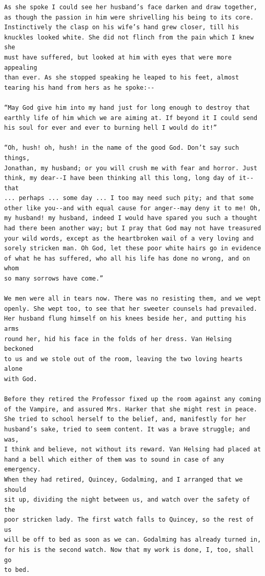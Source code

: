 \documentclass{article}
\begin{document}
\begin{verbatim}
As she spoke I could see her husband’s face darken and draw together,
as though the passion in him were shrivelling his being to its core.
Instinctively the clasp on his wife’s hand grew closer, till his
knuckles looked white. She did not flinch from the pain which I knew she
must have suffered, but looked at him with eyes that were more appealing
than ever. As she stopped speaking he leaped to his feet, almost
tearing his hand from hers as he spoke:--

“May God give him into my hand just for long enough to destroy that
earthly life of him which we are aiming at. If beyond it I could send
his soul for ever and ever to burning hell I would do it!”

“Oh, hush! oh, hush! in the name of the good God. Don’t say such things,
Jonathan, my husband; or you will crush me with fear and horror. Just
think, my dear--I have been thinking all this long, long day of it--that
... perhaps ... some day ... I too may need such pity; and that some
other like you--and with equal cause for anger--may deny it to me! Oh,
my husband! my husband, indeed I would have spared you such a thought
had there been another way; but I pray that God may not have treasured
your wild words, except as the heartbroken wail of a very loving and
sorely stricken man. Oh God, let these poor white hairs go in evidence
of what he has suffered, who all his life has done no wrong, and on whom
so many sorrows have come.”

We men were all in tears now. There was no resisting them, and we wept
openly. She wept too, to see that her sweeter counsels had prevailed.
Her husband flung himself on his knees beside her, and putting his arms
round her, hid his face in the folds of her dress. Van Helsing beckoned
to us and we stole out of the room, leaving the two loving hearts alone
with God.

Before they retired the Professor fixed up the room against any coming
of the Vampire, and assured Mrs. Harker that she might rest in peace.
She tried to school herself to the belief, and, manifestly for her
husband’s sake, tried to seem content. It was a brave struggle; and was,
I think and believe, not without its reward. Van Helsing had placed at
hand a bell which either of them was to sound in case of any emergency.
When they had retired, Quincey, Godalming, and I arranged that we should
sit up, dividing the night between us, and watch over the safety of the
poor stricken lady. The first watch falls to Quincey, so the rest of us
will be off to bed as soon as we can. Godalming has already turned in,
for his is the second watch. Now that my work is done, I, too, shall go
to bed.



\end{verbatim}
\end{document}
